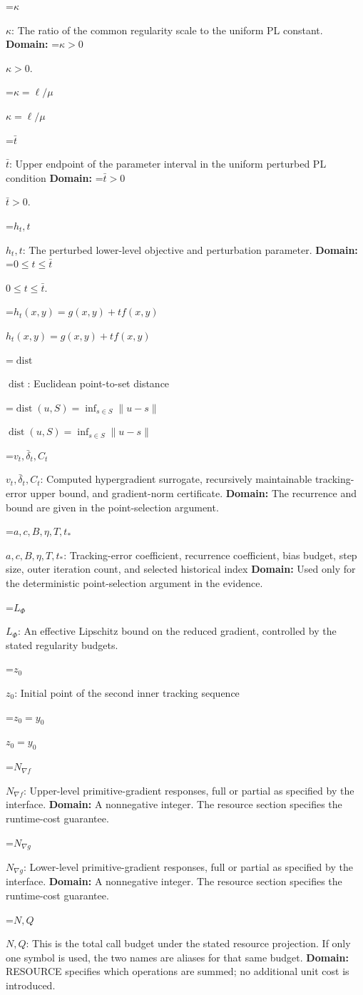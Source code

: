 \documentclass[10pt,a4paper]{article}
\newcommand{\AtlasMath}[1]{\par\begingroup\centering\setbox0=\hbox{$\displaystyle #1$}\ifdim\wd0>1.4\linewidth\typeout{ATLAS WIDE FORMULA: \the\wd0}\fi\ifdim\wd0>\linewidth\resizebox{\linewidth}{!}{\box0}\else\box0\fi\par\endgroup}
\newcommand{\AtlasInlineMath}[1]{\begingroup\setbox0=\hbox{$#1$}\ifdim\wd0>.4\linewidth\endgroup\AtlasMath{#1}\else\endgroup$#1$\fi}
\begin{document}
\AtlasInlineMath{\kappa}: The ratio of the common regularity scale to the uniform PL constant. \textbf{Domain:} \AtlasInlineMath{\kappa>0}.

\AtlasInlineMath{\kappa=\ell/\mu}

\AtlasInlineMath{\bar t}: Upper endpoint of the parameter interval in the uniform perturbed PL condition \textbf{Domain:} \AtlasInlineMath{\bar t>0}.

\AtlasInlineMath{h_t,t}: The perturbed lower-level objective and perturbation parameter. \textbf{Domain:} \AtlasInlineMath{0\le t\le\bar t}.

\AtlasInlineMath{h_t(x,y)=g(x,y)+tf(x,y)}

\AtlasInlineMath{\operatorname{dist}}: Euclidean point-to-set distance

\AtlasInlineMath{\operatorname{dist}(u,S)=\inf_{s\in S}\|u-s\|}

\AtlasInlineMath{v_t,\bar\delta_t,C_t}: Computed hypergradient surrogate, recursively maintainable tracking-error upper bound, and gradient-norm certificate. \textbf{Domain:} The recurrence and bound are given in the point-selection argument.

\AtlasInlineMath{a,c,B,\eta,T,t_*}: Tracking-error coefficient, recurrence coefficient, bias budget, step size, outer iteration count, and selected historical index \textbf{Domain:} Used only for the deterministic point-selection argument in the evidence.

\AtlasInlineMath{L_\Phi}: An effective Lipschitz bound on the reduced gradient, controlled by the stated regularity budgets.

\AtlasInlineMath{z_0}: Initial point of the second inner tracking sequence

\AtlasInlineMath{z_0=y_0}

\AtlasInlineMath{N_{\nabla f}}: Upper-level primitive-gradient responses, full or partial as specified by the interface. \textbf{Domain:} A nonnegative integer. The resource section specifies the runtime-cost guarantee.

\AtlasInlineMath{N_{\nabla g}}: Lower-level primitive-gradient responses, full or partial as specified by the interface. \textbf{Domain:} A nonnegative integer. The resource section specifies the runtime-cost guarantee.

\AtlasInlineMath{N,Q}: This is the total call budget under the stated resource projection. If only one symbol is used, the two names are aliases for that same budget. \textbf{Domain:} RESOURCE specifies which operations are summed; no additional unit cost is introduced.
\end{document}
